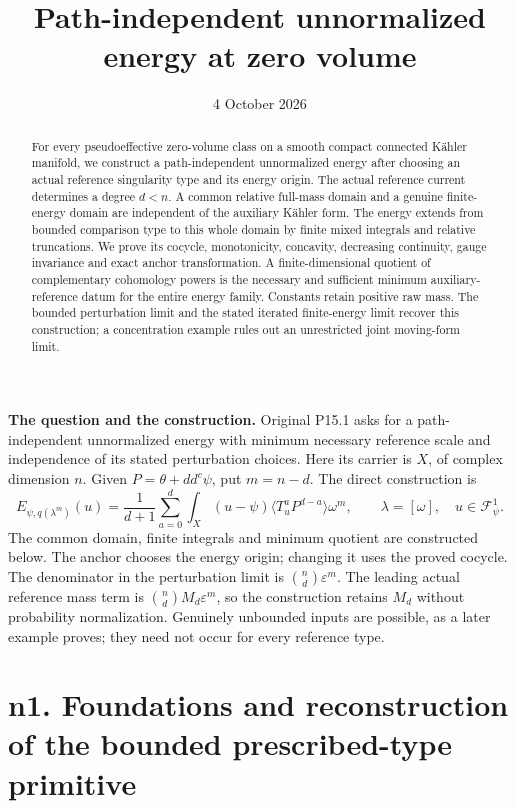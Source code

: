 \documentclass[
]{article}
\title{Path-independent unnormalized energy at zero volume}
\author{}
\date{4 October 2026}
\begin{document}
\maketitle

\begin{abstract}
For every pseudoeffective zero-volume class on a smooth compact connected
K\"ahler manifold, we construct a path-independent unnormalized energy
after choosing an actual reference singularity type and its energy
origin. The actual reference current determines a degree \(d<n\).
A common relative full-mass domain and a genuine finite-energy domain
are independent of the auxiliary K\"ahler form. The energy extends from
bounded comparison type to this whole domain by finite mixed integrals
and relative truncations. We prove its cocycle, monotonicity, concavity,
decreasing continuity, gauge invariance and exact anchor transformation.
A finite-dimensional quotient of complementary cohomology powers is
the necessary and sufficient minimum auxiliary-reference datum for the
entire energy family. Constants retain positive raw mass. The bounded
perturbation limit and the stated iterated finite-energy limit recover
this construction; a concentration example rules out an unrestricted
joint moving-form limit.
\end{abstract}

\textbf{The question and the construction.} Original P15.1 asks for a
path-independent unnormalized energy with minimum necessary reference
scale and independence of its stated perturbation choices. Here its
carrier is \(X\), of complex dimension \(n\). Given
\(P=\theta+dd^c\psi\), put \(m=n-d\). The direct construction is
\[
 E_{\psi,q(\lambda^m)}(u)=\frac1{d+1}\sum_{a=0}^d
 \int_X(u-\psi)\langle T_u^aP^{d-a}\rangle\omega^m,
 \qquad \lambda=[\omega],\quad u\in\mathcal F^1_\psi.
\]
The common domain, finite integrals and minimum quotient are constructed
below. The anchor chooses the energy origin; changing it uses the proved
cocycle. The denominator in the perturbation limit is
\(\binom nd\varepsilon^m\). The leading actual reference mass term is
\(\binom nd M_d\varepsilon^m\), so the construction retains \(M_d\)
without probability normalization. Genuinely unbounded inputs are
possible, as a later example proves; they need not occur for every
reference type.

\section{n1. Foundations and reconstruction of the bounded
prescribed-type
primitive}\label{n1.-foundations-and-reconstruction-of-the-bounded-prescribed-type-primitive}
\end{document}
